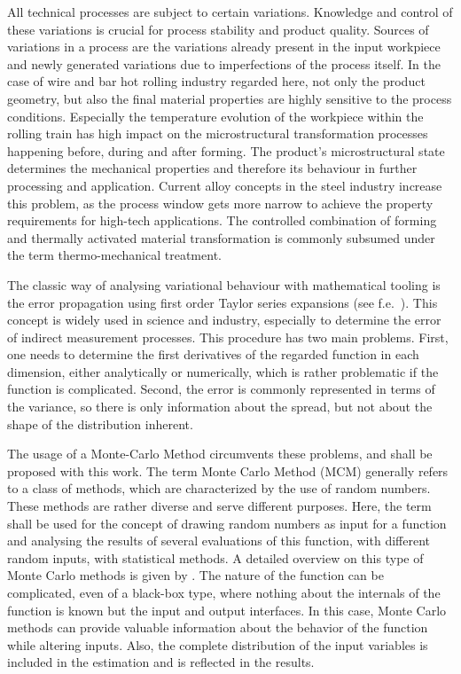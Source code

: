 All technical processes are subject to certain variations.
Knowledge and control of these variations is crucial for process stability and product quality.
Sources of variations in a process are the variations already present in the input workpiece and newly generated variations due to imperfections of the process itself.
In the case of wire and bar hot rolling industry regarded here, not only the product geometry, but also the final material properties are highly sensitive to the process conditions.
Especially the temperature evolution of the workpiece within the rolling train has high impact on the microstructural transformation processes happening before, during and after forming.
The product's microstructural state determines the mechanical properties and therefore its behaviour in further processing and application.
Current alloy concepts in the steel industry increase this problem, as the process window gets more narrow to achieve the property requirements for high-tech applications.
The controlled combination of forming and thermally activated material transformation is commonly subsumed under the term thermo-mechanical treatment.

The classic way of analysing variational behaviour with mathematical tooling is the error propagation using first order Taylor series expansions (see f.e.~\cite{Ku1966}).
This concept is widely used in science and industry, especially to determine the error of indirect measurement processes.
This procedure has two main problems.
First, one needs to determine the first derivatives of the regarded function in each dimension, either analytically or numerically, which is rather problematic if the function is complicated.
Second, the error is commonly represented in terms of the variance, so there is only information about the spread, but not about the shape of the distribution inherent.

The usage of a Monte-Carlo Method circumvents these problems, and shall be proposed with this work.
The term Monte Carlo Method (MCM) generally refers to a class of methods, which are characterized by the use of random numbers.
These methods are rather diverse and serve different purposes.
Here, the term shall be used for the concept of drawing random numbers as input for a function and analysing the results of several evaluations of this function, with different random inputs, with statistical methods.
A detailed overview on this type of Monte Carlo methods is given by \textcite{Lemieux2009}.
The nature of the function can be complicated, even of a black-box type, where nothing about the internals of the function is known but the input and output interfaces.
In this case, Monte Carlo methods can provide valuable information about the behavior of the function while altering inputs.
Also, the complete distribution of the input variables is included in the estimation and is reflected in the results.

